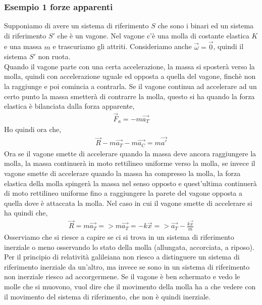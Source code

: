        \subsubsection{Esempio 1 forze apparenti}
            Supponiamo di avere un sistema di riferimento $S$ che sono i binari ed un sistema di riferimento $S'$ che è un vagone. Nel vagone c'è una molla di costante elastica $K$ e una massa $m$ e trascuriamo gli attriti. Consideriamo anche $\vec{\omega}=\vec{0}$, quindi il sistema $S'$ non ruota.\\
            Quando il vagone parte con una certa accelerazione, la massa si sposterà verso la molla, quindi con accelerazione uguale ed opposta a quella del vagone, finchè non la raggiunge e poi comincia a contrarla. Se il vagone continua ad accelerare ad un certo punto la massa smetterà di contrarre la molla, questo si ha quando la forza elastica è bilanciata dalla forza apparente,
            \begin{align*}
                \vec{F}_a=-m\vec{a_T}
            \end{align*}
            Ho quindi ora che,
            \begin{align*}
                \vec{R}-m\vec{a_T}-m\vec{a_C}=m\vec{a'}
            \end{align*}
            Ora se il vagone smette di accelerare quando la massa deve ancora raggiungere la molla, la massa continuerà in moto rettilineo uniforme verso la molla, se invece il vagone smette di accelerare quando la massa ha compresso la molla, la forza elastica della molla spingerà la massa nel senso opposto e quest'ultima continuerà di moto rettilineo uniforme fino a raggiungere la parete del vagone opposta a quella dove è attaccata la molla. Nel caso in cui il vagone smette di accelerare si ha quindi che,
            \begin{align*}
                \vec{R}=m\vec{a_T}=>m\vec{a_T}=-k\vec{x}=>\vec{a_T}-\frac{k\vec{x}}{m}
            \end{align*}
            Osserviamo che si riesce a capire se ci si trova in un sistema di riferimento inerziale o meno osservando lo stato della molla (allungata, accorciata, a riposo).\\
            Per il principio di relatività galileiana non riesco a distinguere un sistema di riferimento inerziale da un'altro, ma invece se sono in un sistema di riferimento non inerziale riesco ad accorgermene. Se il vagone è ben schermato e vedo le molle che si muovono, vuol dire che il movimento della molla ha a che vedere con il movimento del sistema di riferimento, che non è quindi inerziale.


